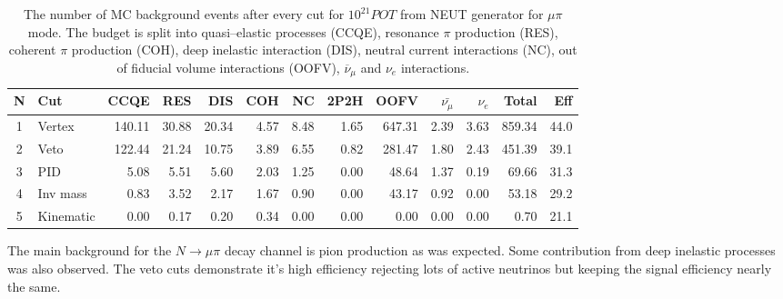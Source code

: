 \documentclass[../main.tex]{subfiles}
\begin{document}
\begin{table}[!ht]
\begin{tabular}{|c|l|r|r|r|r|r|r|r|r|r|r|r|}
  \hline
  N & Cut           &  CCQE   &  RES  &  DIS  &  COH  &  NC  &  2P2H  &  OOFV  &$\bar{\nu_{\mu}}$& $\nu_{e}$ & Total  & Eff\\
  \hline
  1 & Vertex        & 140.11  & 30.88 & 20.34 & 4.57  & 8.48 & 1.65   & 647.31 & 2.39            &  3.63     & 859.34 & 44.0 \\
  \hline
  2 & Veto          &  122.44  & 21.24 & 10.75 & 3.89  & 6.55 & 0.82   & 281.47 & 1.80            &  2.43     & 451.39 & 39.1 \\
  \hline
  3 & PID           & 5.08    & 5.51  & 5.60  & 2.03  & 1.25 & 0.00   & 48.64  & 1.37            &  0.19     &  69.66 & 31.3 \\
  \hline
  4 & Inv mass      & 0.83    & 3.52  & 2.17  & 1.67  & 0.90 & 0.00   & 43.17  & 0.92            &  0.00     &  53.18 & 29.2  \\
  \hline
  5 & Kinematic     & 0.00    & 0.17  & 0.20  & 0.34  & 0.00 & 0.00   & 0.00   & 0.00            &  0.00     &  0.70  & 21.1 \\
    \hline

\end{tabular}
\caption{The number of MC background events after every cut for $10^{21} POT$ from NEUT generator for $\mu\pi$ mode. The budget is split into quasi--elastic processes (CCQE), resonance $\pi$ production (RES), coherent $\pi$ production (COH), deep inelastic interaction (DIS), neutral current interactions (NC), out of fiducial volume interactions (OOFV), $\overline{\nu}_\mu$ and $\nu_e$ interactions.}
\label{tbl:HNL:bgOrigMu}
\end{table}

The main background for the $N\to\mu\pi$ decay channel is pion production as was expected. Some contribution from deep inelastic processes was also observed. The veto cuts demonstrate it's high efficiency rejecting lots of active neutrinos but keeping the signal efficiency nearly the same.
\end{document}
